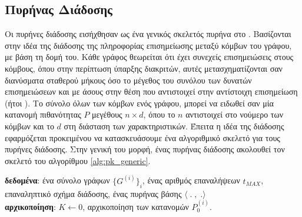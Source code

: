 \subsection{Πυρήνας Διάδοσης}
\label{ssec:p2k}
Οι πυρήνες διάδοσης εισήχθησαν ως ένα γενικός σκελετός πυρήνα στο \cite{Neumann2016}.
Βασίζονται στην ιδέα της διάδοσης της πληροφορίας επισημείωσης μεταξύ κόμβων του γράφου, με βάση τη δομή του.
Κάθε γράφος θεωρείται ότι έχει συνεχείς επισημειώσεις στους κόμβους, όπου στην περίπτωση ύπαρξης διακριτών, αυτές μετασχηματίζονται σαν διανύσματα σταθερού μήκους όσο το μέγεθος του συνόλου των δυνατών επισημειώσεων και με άσους στην θέση που αντιστοιχεί στην αντίστοιχη επισημείωση (ήτοι ).
Το σύνολο όλων των κόμβων ενός γράφου, μπορεί να ειδωθεί σαν μία κατανομή πιθανότητας $P$ μεγέθους $n \times d$, όπου το $n$ αντιστοιχεί στο νούμερο των κόμβων και το $d$ στη διάσταση των χαρακτηριστικών.
Έπειτα η ιδέα της διάδοσης εφαρμόζεται προκειμένου να κατασκευάσουμε ένα αλγοριθμικό σκελετό για τους πυρήνες διάδοσης.
Στην γενική του μορφή, ένας πυρήνας διάδοσης ακολουθεί τον σκελετό του αλγορίθμου \ref{alg:pk_generic}.
\begin{algorithm}[]
\textbf{δεδομένα}: ένα σύνολο γράφων $\{G^{(i)}\}_{i}$, ένας αριθμός επαναλήψεων $t_{MAX}$, επαναληπτικό σχήμα διάδοσης, ένας πυρήνας βάσης $\langle\;.\;,\;. \rangle$
\\
\textbf{αρχικοποίηση}: $K \leftarrow 0$, αρχικοποίηση των κατανομών $P_{0}^{(i)}$.

\caption{}
\label{alg:pk_generic}
\end{algorithm}

